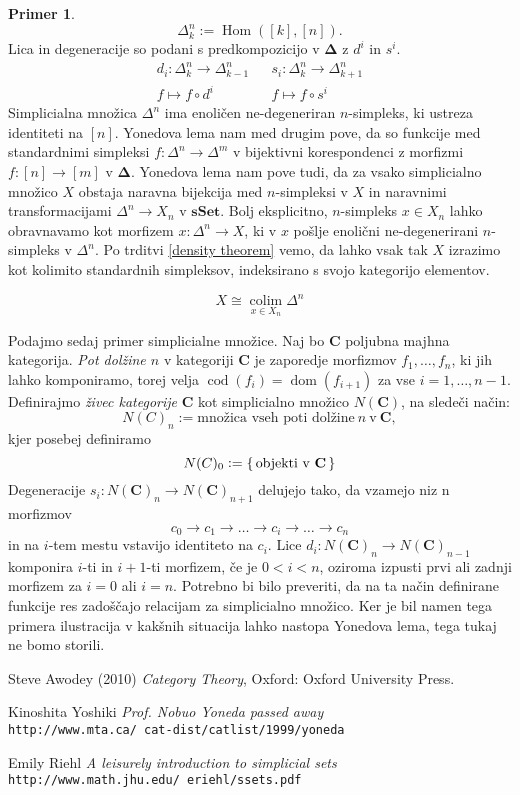 \documentclass[12pt,a4paper]{book}
\theoremstyle{definition}
\theoremstyle{plain}
\theoremstyle{definition}
\newtheorem{primer}{Primer}[section]
\theoremstyle{remark}
\newcommand{\cat}[1]{\textbf{#1}}
\DeclareMathOperator{\Hom}{Hom}
\DeclareMathOperator{\colim}{colim}
\DeclareMathOperator{\dom}{dom}
\DeclareMathOperator{\cod}{cod}
\renewcommand{\set}[1]{\{\,#1\,\}}
\begin{document}
\begin{primer}
$$\Delta_k^n := \Hom([k], [n]).$$
Lica in degeneracije so podani s predkompozicijo v $\mathbf{\Delta}$ z $d^i$ in $s^i$.
\begin{align*}
d_i : \Delta_k^n \to \Delta_{k-1}^n & & s_i : \Delta_k^n \to \Delta_{k+1}^n \\
f \mapsto f \circ d^i & & f \mapsto f \circ s^i
\end{align*}
Simplicialna množica $\Delta^n$ ima enoličen ne-degeneriran $n$-simpleks, ki ustreza identiteti na $[n]$. Yonedova lema nam med drugim pove, da so funkcije med standardnimi simpleksi $f : \Delta^n \to \Delta^m$ v bijektivni korespondenci z morfizmi $f : [n] \to [m]$ v $\mathbf{\Delta}$. Yonedova lema nam pove tudi, da za vsako simplicialno množico $X$ obstaja naravna bijekcija med $n$-simpleksi v $X$ in naravnimi transformacijami $\Delta^n \to X_n$ v $\cat{sSet}$. Bolj eksplicitno, $n$-simpleks $x \in X_n$ lahko obravnavamo kot morfizem $x : \Delta^n \to X$, ki v $x$ pošlje enolični ne-degenerirani $n$-simpleks v $\Delta^n$.
Po trditvi \ref{density theorem} vemo, da lahko vsak tak $X$ izrazimo kot kolimito standardnih simpleksov, indeksirano s svojo kategorijo elementov.

$$X \cong \underset{x \in X_n}{\colim}\Delta^n$$


Podajmo sedaj primer simplicialne množice. Naj bo $\cat{C}$ poljubna majhna kategorija. \emph{Pot dolžine $n$} v kategoriji $\cat{C}$ je zaporedje morfizmov $f_1, \ldots, f_n$, ki jih lahko komponiramo, torej velja $\cod(f_i) = \dom(f_{i+1})$ za vse $i = 1, \ldots, n-1$. 
Definirajmo \emph{živec kategorije} $\cat{C}$ kot simplicialno množico $N(\cat{C})$, na sledeči način:
$$N(C)_n :=  \text{množica vseh poti dolžine} \ n \ \text{v} \ \cat{C},$$
kjer posebej definiramo
$$N(C)_0 := \set{\text{objekti v \cat{C}}}$$
Degeneracije $s_i:N(\cat{C})_n \to N(\cat{C})_{n+1}$ delujejo tako, da vzamejo niz n morfizmov
$$ c_0 \rightarrow c_1 \rightarrow \ldots \rightarrow c_i \rightarrow \ldots \rightarrow c_n$$
in na $i$-tem mestu vstavijo identiteto na $c_i$. Lice $d_i : N(\cat{C})_n \to N(\cat{C})_{n-1}$ komponira $i$-ti in $i+1$-ti morfizem, če je $0 < i < n$, oziroma izpusti prvi ali zadnji morfizem za $i = 0$ ali $i = n$.
Potrebno bi bilo preveriti, da na ta način definirane funkcije res zadoščajo relacijam za simplicialno množico. Ker je bil namen tega primera ilustracija v kakšnih situacija lahko nastopa Yonedova lema, tega tukaj ne bomo storili.
\end{primer}

\begin{thebibliography}{9}

Steve Awodey (2010)
\textit{Category Theory},
Oxford: Oxford University Press.

Kinoshita Yoshiki
\textit{Prof. Nobuo Yoneda passed away}
\\\texttt{http://www.mta.ca/~cat-dist/catlist/1999/yoneda}

Emily Riehl
\textit{A leisurely introduction to simplicial sets}
\\\texttt{http://www.math.jhu.edu/~eriehl/ssets.pdf}
\end{thebibliography}
\end{document}
